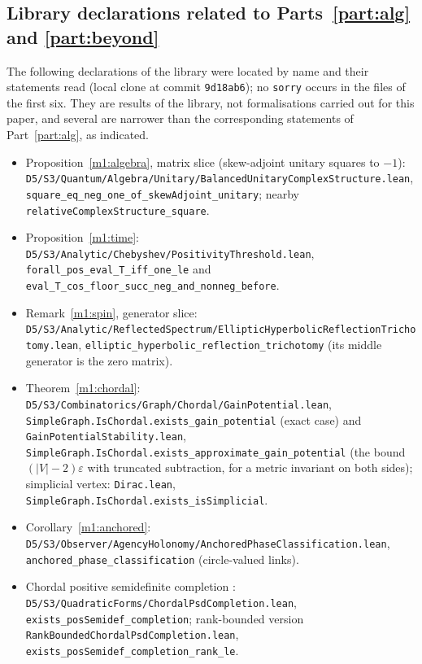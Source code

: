 \documentclass[11pt,reqno]{amsart}
\theoremstyle{definition}
\theoremstyle{remark}
\numberwithin{equation}{section}
\begin{document}
\subsection{Library declarations related to Parts~\ref{part:alg} and \ref{part:beyond}}\label{sec:leanlib}
The following declarations of the library \cite{Tru} were located by name and their statements read (local clone at commit
\texttt{9d18ab6}); no \texttt{sorry} occurs in the files of the first six.  They are results of the library, not formalisations
carried out for this paper, and several are narrower than the corresponding statements of Part~\ref{part:alg}, as indicated.
{\small\raggedright
\begin{itemize}[leftmargin=1.5em]
\item Proposition~\ref{m1:algebra}, matrix slice (skew-adjoint unitary squares to $-1$):
\texttt{D5/S3/Quantum/Algebra/Unitary/BalancedUnitaryComplexStructure.lean},
\texttt{square\_eq\_neg\_one\_of\_skewAdjoint\_unitary}; nearby \texttt{relativeComplexStructure\_square}.
\item Proposition~\ref{m1:time}: \texttt{D5/S3/Analytic/Chebyshev/PositivityThreshold.lean},
\texttt{forall\_pos\_eval\_T\_iff\_one\_le} and \texttt{eval\_T\_cos\_floor\_succ\_neg\_and\_nonneg\_before}.
\item Remark~\ref{m1:spin}, generator slice: \texttt{D5/S3/Analytic/ReflectedSpectrum/EllipticHyperbolicReflectionTrichotomy.lean},
\texttt{elliptic\_hyperbolic\_reflection\_trichotomy} (its middle generator is the zero matrix).
\item Theorem~\ref{m1:chordal}: \texttt{D5/S3/Combinatorics/Graph/Chordal/GainPotential.lean},
\texttt{SimpleGraph.IsChordal.exists\_gain\_potential} (exact case) and \texttt{GainPotentialStability.lean},
\texttt{SimpleGraph.IsChordal.exists\_approximate\_gain\_potential} (the bound $(|V|-2)\varepsilon$ with truncated subtraction, for a metric
invariant on both sides); simplicial vertex: \texttt{Dirac.lean}, \texttt{SimpleGraph.IsChordal.exists\_isSimplicial}.
\item Corollary~\ref{m1:anchored}: \texttt{D5/S3/Observer/AgencyHolonomy/AnchoredPhaseClassification.lean},
\texttt{anchored\_phase\_classification} (circle-valued links).
\item Chordal positive semidefinite completion \cite{m1:Grone}: \texttt{D5/S3/QuadraticForms/ChordalPsdCompletion.lean},
\texttt{exists\_posSemidef\_completion}; rank-bounded version \texttt{RankBoundedChordalPsdCompletion.lean},
\texttt{exists\_posSemidef\_completion\_rank\_le}.

\end{itemize}}
\end{document}
